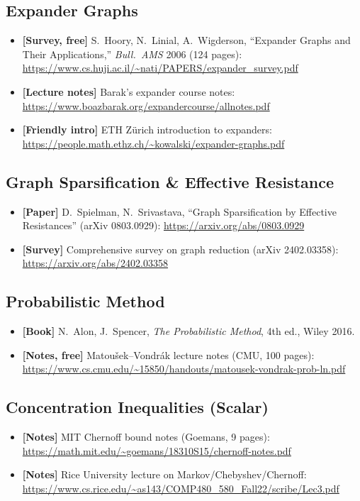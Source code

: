 \documentclass[12pt]{article}
\theoremstyle{definition}
\theoremstyle{remark}
\begin{document}
\subsection*{Expander Graphs}

\begin{itemize}
  \item \textbf{[Survey, free]} S.~Hoory, N.~Linial, A.~Wigderson, ``Expander Graphs and Their Applications,''
        \emph{Bull.\ AMS} 2006 (124 pages):
        \url{https://www.cs.huji.ac.il/~nati/PAPERS/expander_survey.pdf}
  \item \textbf{[Lecture notes]} Barak's expander course notes:
        \url{https://www.boazbarak.org/expandercourse/allnotes.pdf}
  \item \textbf{[Friendly intro]} ETH Zürich introduction to expanders:
        \url{https://people.math.ethz.ch/~kowalski/expander-graphs.pdf}
\end{itemize}

\subsection*{Graph Sparsification \& Effective Resistance}

\begin{itemize}
  \item \textbf{[Paper]} D.~Spielman, N.~Srivastava, ``Graph Sparsification by Effective Resistances''
        (arXiv 0803.0929):
        \url{https://arxiv.org/abs/0803.0929}
  \item \textbf{[Survey]} Comprehensive survey on graph reduction (arXiv 2402.03358):
        \url{https://arxiv.org/abs/2402.03358}
\end{itemize}

\subsection*{Probabilistic Method}

\begin{itemize}
  \item \textbf{[Book]} N.~Alon, J.~Spencer, \emph{The Probabilistic Method}, 4th ed., Wiley 2016.
  \item \textbf{[Notes, free]} Matou\v{s}ek--Vondr\'ak lecture notes (CMU, 100 pages):
        \url{https://www.cs.cmu.edu/~15850/handouts/matousek-vondrak-prob-ln.pdf}
\end{itemize}

\subsection*{Concentration Inequalities (Scalar)}

\begin{itemize}
  \item \textbf{[Notes]} MIT Chernoff bound notes (Goemans, 9 pages):
        \url{https://math.mit.edu/~goemans/18310S15/chernoff-notes.pdf}
  \item \textbf{[Notes]} Rice University lecture on Markov/Chebyshev/Chernoff:
        \url{https://www.cs.rice.edu/~as143/COMP480_580_Fall22/scribe/Lec3.pdf}
\end{itemize}
\end{document}

